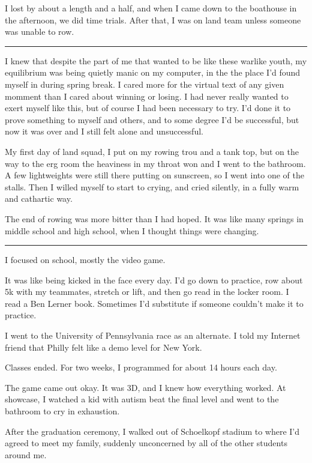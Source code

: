 I lost by about a length and a half, and when I came down to the boathouse in
the afternoon, we did time trials.  After that, I was on land team unless
someone was unable to row.

\plainfancybreak{12pt}{2}{* * *}

I knew that despite the part of me that wanted to be like these warlike youth,
my equilibrium was being quietly manic on my computer, in the the place I'd
found myself in during spring break.  I cared more for the virtual text of any
given momment than I cared about winning or losing.  I had never really wanted
to exert myself like this, but of course I had been necessary to try.  I'd done
it to prove something to myself and others, and to some degree I'd be
successful, but now it was over and I still felt alone and unsuccessful.

My first day of land squad, I put on my rowing trou and a tank top, but on the
way to the erg room the heaviness in my throat won and I went to the bathroom.
A few lightweights  were still there putting on sunscreen, so I went into one of
the stalls.  Then I willed myself to start to crying, and cried silently, in a
fully warm and cathartic way.  

The end of rowing was more bitter than I had hoped.  It was like many springs in
middle school and high school, when I thought things were changing.


\plainfancybreak{12pt}{2}{* * *}

I focused on school, mostly the video game. 

It was like being kicked in the face every day.  I'd go down to practice, row
about 5k with my teammates, stretch or lift, and then go read in the locker
room.  I read a Ben Lerner book.  Sometimes I'd substitute if someone couldn't
make it to practice.

I went to the University of Pennsylvania race as an alternate.  I told my
Internet friend that Philly felt like a demo level for New York.

Classes ended.  For two weeks, I programmed for about 14 hours each day.  

The game came out okay.  It was 3D, and I knew how everything worked.  At
showcase, I watched a kid with autism beat the final level and went to the
bathroom to cry in exhaustion.

After the graduation ceremony, I walked out of Schoelkopf stadium to where I'd
agreed to meet my family, suddenly unconcerned by all of the other students
around me.

